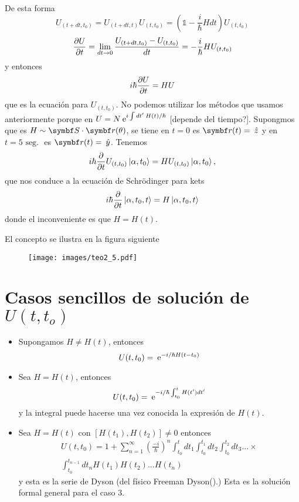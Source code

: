 \documentclass[10pt,oneside]{CBFT_book}
\begin{document}
De esta forma 
\[
	U_{(t+dt,t_0)} =  U_{(t+dt,t)} U_{(t,t_0)}  = 
	\left( \mathbb{1} - \frac{i}{\hbar} H dt \right) U_{(t,t_0)}
\]
\[
	\frac{\partial^{\hspace{-0.05em}} {U}}{\partial {t}^{\hspace{-0.05em}}} = \lim_{dt\to 0} \frac{ U_{(t+dt,t_0)} - U_{(t,t_0)} }{dt} = 
	- \frac{i}{\hbar}H U_{(t,t_0)}
\]
y entonces 
\[
	i\hbar\frac{\partial^{\hspace{-0.05em}} {U}}{\partial {t}^{\hspace{-0.05em}}} = HU
\]
que es la ecuación para $U_{(t,t_0)}$.
No podemos utilizar los métodos que usamos anteriormente porque en
$U = N \:\mathrm{e}^{i \int dt' \:H(t)/\hbar }$ [depende del tiempo?].
Supongmos que es $ H \sim \vb S \cdot \vb r (\theta)$, se tiene en
$t=0$ es $\vb r(t) = \zver$ y en $t = 5 \text{ seg. } $ es $\vb r(t) = \yver$.
Tenemos
\[
	i\hbar\frac{\partial^{\hspace{-0.05em}} {}}{\partial {t}^{\hspace{-0.05em}}} U_{(t,t_0)} \Ket{\alpha,t_0} = H U_{(t,t_0)} \Ket{\alpha,t_0},
\]
que nos conduce a la ecuación de Schrödinger para kets
\[
	i\hbar\frac{\partial^{\hspace{-0.05em}} {}}{\partial {t}^{\hspace{-0.05em}}} \Ket{\alpha,t_0,t} = H \Ket{\alpha,t_0,t}
\]
donde el inconveniente es que $H=H(t)$.

El concepto se ilustra en la figura siguiente
\begin{figure}[htb]
	\begin{center}
	\texttt{[image: images/teo2\_5.pdf]}	 
	\end{center}
	\caption{}
\end{figure} 


\section{Casos sencillos de solución de $U(t,t_o)$}

\begin{itemize}
 \item Supongamos $ H \neq H(t)$, entonces
 \[
	U( t, t_0) = \:\mathrm{e}^{-i/\hbar H (t-t_0)} 
 \]
 \item Sea $ H = H(t)$, entonces
 \[
	U( t, t_0) = \:\mathrm{e}^{-i/\hbar \int_{t_0}^t H(t')dt'} 
 \]
 y la integral puede hacerse una vez conocida la expresión de $H(t)$.
 \item Sea $ H = H(t)$ con $[H(t_1),H(t_2)] \neq 0$ entonces
 \begin{multline*}
	U( t, t_0) =  1 + \sum_{n=1}^{\infty} \left( \frac{-i}{\hbar}\right)^n 
		\int_{t_0}^t dt_1 \int_{t_0}^{t_1} dt_2 \int_{t_0}^{t_2} dt_3 ... \times \\
			\int_{t_0}^{t_{n-1}} dt_n H(t_1) H(t_2) ... H(t_n)    
 \end{multline*}
y esta es la serie de Dyson (del físico Freeman Dyson().)
Esta es la solución formal general para el caso 3. 
\end{itemize}
\end{document}
